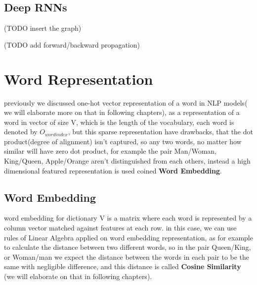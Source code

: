 \documentclass[4apaper,12pt]{book}
\begin{document}
\begin{description}
    \section{Deep RNNs}
    \begin{description}
    \item (TODO insert the graph)
    \item (TODO add forward/backward propagation)
    \end{description}
  \end{description}
  \section{Word Representation}
  \begin{description}
  \item previously we discussed one-hot vector representation of a word in NLP models( we will elaborate more on that in following chapters), as a representation of a word in vector of size V, which is the length of the vocabulary, each word is denoted by $O_{word index}$, but this sparse representation have drawbacks, that the dot product(degree of alignment) isn't captured, so any two words, no matter how similar will have zero dot product,  for example the pair Man/Woman, King/Queen, Apple/Orange aren't distinguished from each others, instead a high dimensional featured representation is used coined \textbf{Word Embedding}.
    \subsection{Word Embedding}
    \begin{description}
    \item word embedding for dictionary V is a matrix where each word is represented by a column vector matched against features at each row. in this case, we can use rules of Linear Algebra applied on word embedding representation, as for example to calculate the distance between two different words, so in the pair Queen/King, or Woman/man we expect the distance between the words in each pair to be the same with negligible difference, and this distance is called \textbf{Cosine Similarity}  (we will elaborate on that in following chapters).

\end{description}
\end{description}
\end{document}
